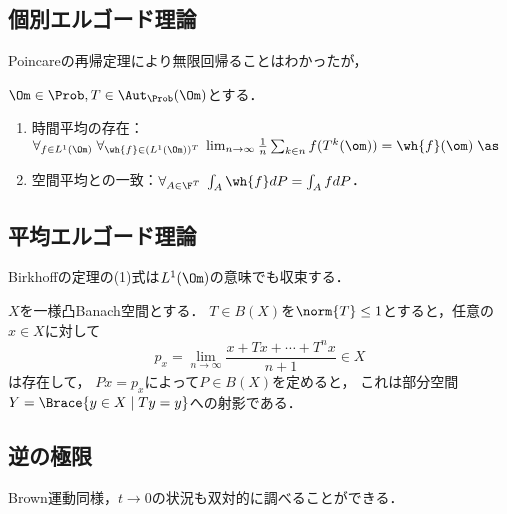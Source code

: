 \documentclass[uplatex,dvipdfmx]{jsreport}
\begin{document}
\subsection{個別エルゴード理論}

\begin{tcolorbox}[colframe=ForestGreen, colback=ForestGreen!10!white,breakable,colbacktitle=ForestGreen!40!white,coltitle=black,fonttitle=\bfseries\sffamily,
title=]
    Poincareの再帰定理により無限回帰ることはわかったが，
\end{tcolorbox}

\begin{theorem}[Birkhoff (32)]
    $\Om\in\Prob,T\in\Aut_\Prob(\Om)$とする．
    \begin{enumerate}
        \item 時間平均の存在：$\forall_{f\in L^1(\Om)}\;\forall_{\wh{f}\in (L^1(\Om))^T}\;\lim_{n\to\infty}\frac{1}{n}\sum_{k\in n}f(T^k(\om))=\wh{f}(\om)\;\as$
        \item 空間平均との一致：$\forall_{A\in\F^T}\;\int_A\wh{f}dP=\int_AfdP$．
    \end{enumerate}
\end{theorem}

\subsection{平均エルゴード理論}

\begin{theorem}
    Birkhoffの定理の(1)式は$L^1(\Om)$の意味でも収束する．
\end{theorem}

\begin{theorem}[Riesz (1938)]
    $X$を一様凸Banach空間とする．
    $T\in B(X)$を$\norm{T}\le1$とすると，任意の$x\in X$に対して
    \[p_x=\lim_{n\to\infty}\frac{x+Tx+\cdots+T^nx}{n+1}\in X\]
    は存在して，
    $Px=p_x$によって$P\in B(X)$を定めると，
    これは部分空間$Y=\Brace{y\in X\mid Ty=y}$への射影である．
\end{theorem}

\subsection{逆の極限}

\begin{tcolorbox}[colframe=ForestGreen, colback=ForestGreen!10!white,breakable,colbacktitle=ForestGreen!40!white,coltitle=black,fonttitle=\bfseries\sffamily,
title=]
    Brown運動同様，$t\to0$の状況も双対的に調べることができる．
\end{tcolorbox}
\end{document}
